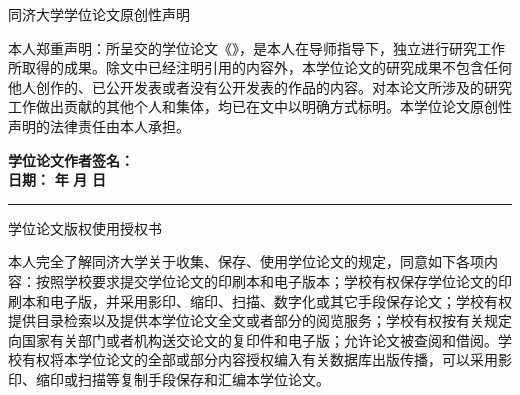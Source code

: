 \clearpage
\makeatother

\makeatletter 
\vspace*{-0.1cm}
\begin{center}
  \heiti\erhao 同济大学学位论文原创性声明
\end{center}
\vskip4pt\sihao[1.5]\par
本人郑重声明：所呈交的学位论文《\tongji@cheadingtitlenew》，是本人在导师指导下，独立进行研究工作所取得的成果。除文中已经注明引用的内容外，本学位论文的研究成果不包含任何他人创作的、已公开发表或者没有公开发表的作品的内容。对本论文所涉及的研究工作做出贡献的其他个人和集体，均已在文中以明确方式标明。本学位论文原创性声明的法律责任由本人承担。 \par
\begingroup
  \parindent0pt
  \hspace*{7.5cm} \textbf{学位论文作者签名：} \relax\hspace*{1cm}\\[3pt]
  \hspace*{7.5cm} \textbf{日期：} \hspace{1em} \textbf{年} \hspace{1.5em} \textbf{月} \hspace{1.5em} \textbf{日} \relax\hspace*{1cm}
\endgroup

\vspace*{0.5cm}
\hrule

\makeatletter

\vspace*{-0.1cm}
\begin{center}
  \heiti\erhao 学位论文版权使用授权书
\end{center}
\vskip4pt\sihao[1.5]\par
本人完全了解同济大学关于收集、保存、使用学位论文的规定，同意如下各项内容：按照学校要求提交学位论文的印刷本和电子版本；学校有权保存学位论文的印刷本和电子版，并采用影印、缩印、扫描、数字化或其它手段保存论文；学校有权提供目录检索以及提供本学位论文全文或者部分的阅览服务；学校有权按有关规定向国家有关部门或者机构送交论文的复印件和电子版；允许论文被查阅和借阅。学校有权将本学位论文的全部或部分内容授权编入有关数据库出版传播，可以采用影印、缩印或扫描等复制手段保存和汇编本学位论文。 \par


